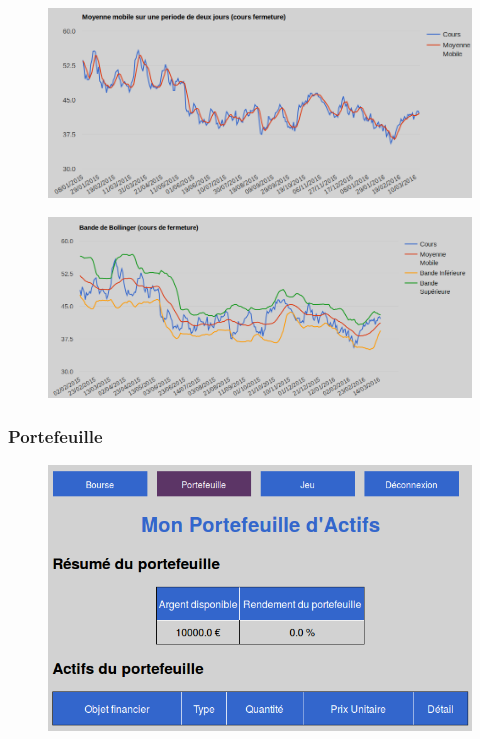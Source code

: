 \begin{enumerate}
\begin{figure}[H]
      \end{figure}
      \begin{figure}[H]
	\center
	\includegraphics[scale=0.5]{../graph/6-historiqueMoyMob.png}
      \end{figure}
      \begin{figure}[H]
	\center
	\includegraphics[scale=0.5]{../graph/6-historiqueBollinger.png} 
      \end{figure}
      
      \end{enumerate}
    
    \subsubsection{Portefeuille}
    \begin{figure}[H]
      \center
      \includegraphics[scale=0.5]{../graph/7-accueilportefeuillevide.png}
    \end{figure}
      
